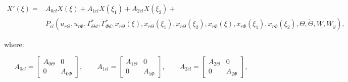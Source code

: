 \documentclass[main.tex]{subfiles}
\begin{document}
\begin{align}
	X'(\xi) =&	A_{0cl}X(\xi) + A_{1cl}X(\xi_1) + A_{2cl} X(\xi_2) + \nonumber\\ &P_{cl}(u_{r\Theta},u_{r\Phi},\Gamma_{\Theta d}^*,\Gamma_{\Phi d}^*,x_{r\Theta}(\xi),x_{r\Theta}(\xi_1), x_{r\Theta}(\xi_2),x_{r\Phi}(\xi),x_{r\Phi}(\xi_1),x_{r\Phi}(\xi_2), \Theta,\check{\Theta},W,W_y),
	\label{eq:totaldynamicsrobust}
\end{align}	

where:

\begin{equation}
A_{0cl} = 
\begin{bmatrix}
A_{0\Theta} & 0 \\
0 & A_{0\Phi}
\end{bmatrix}, \qquad
A_{1cl} =
\begin{bmatrix}
A_{1\Theta} & 0 \\
0 & A_{1\Phi}
\end{bmatrix}, \qquad
A_{2cl} =
\begin{bmatrix}
A_{2\Theta} & 0 \\
0 & A_{2\Phi}
\end{bmatrix},
\label{eq:ClosedLoopMatricesRobust}
\end{equation}
\end{document}
